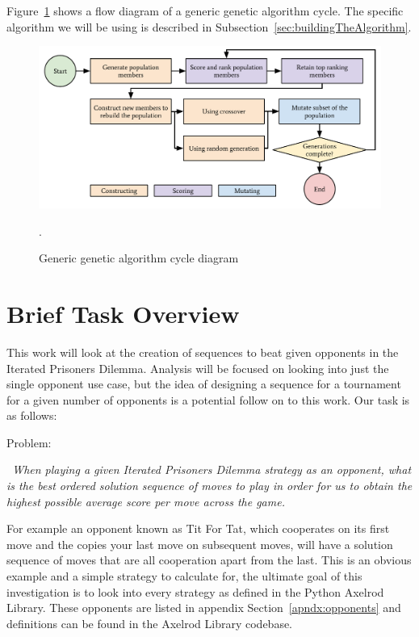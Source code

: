 Figure~\ref{fig:genericGACycle} shows a flow diagram of a generic genetic algorithm cycle.
The specific algorithm we will be using is described in Subsection~\ref{sec:buildingTheAlgorithm}.

\begin{figure}[ht]
    \centering
    \includegraphics[width=1.0\textwidth, center]{./img/flows/ga_cycle.pdf}
    \caption{Generic genetic algorithm cycle diagram}.\label{fig:genericGACycle} 
\end{figure}

\section{Brief Task Overview}\label{sec:briefOverview}
This work will look at the creation of sequences to beat given opponents in the Iterated Prisoners Dilemma.
Analysis will be focused on looking into just the single opponent use case, but the idea of designing a sequence for a tournament for a given number of opponents is a potential follow on to this work.
Our task is as follows:

Problem:
\begin{center}
    \itshape~When playing a given Iterated Prisoners Dilemma strategy as an opponent, what is the best ordered solution sequence of moves to play in order for us to obtain the highest possible average score per move across the game.
\end{center}

For example an opponent known as Tit For Tat, which cooperates on its first move and the copies your last move on subsequent moves, will have a solution sequence of moves that are all cooperation apart from the last.
This is an obvious example and a simple strategy to calculate for, the ultimate goal of this investigation is to look into every strategy as defined in the Python Axelrod Library\cite{axelrodproject}.
These opponents are listed in appendix Section~\ref{apndx:opponents} and definitions can be found in the Axelrod Library codebase.

